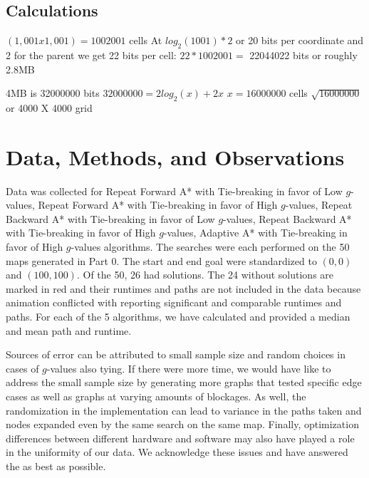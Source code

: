 \documentclass[a4paper,12pt]{article}
\begin{document}
\subsection{Calculations}
$(1,001 x 1,001) = 1002001$ cells \newline
At $log_{2}(1001) * 2$ or 20 bits per coordinate and 2 for the parent we get 22 bits per cell: \newline
$22 * 1002001  = $ 22044022 bits or roughly 2.8MB \newline \newline

4MB  is 32000000 bits \newline
$32000000 = 2log_{2}(x)  + 2x$ \newline
$x = 16000000$ cells \newline
$\sqrt{16000000}$ or 4000 X 4000 grid


\section{Data, Methods, and Observations}

Data was collected for Repeat Forward A* with Tie-breaking in favor of Low $g$-values, Repeat Forward A* with Tie-breaking in favor of High $g$-values,  Repeat Backward A* with Tie-breaking in favor of Low $g$-values, Repeat Backward A* with Tie-breaking in favor of High $g$-values, Adaptive A* with Tie-breaking in favor of High $g$-values algorithms. The searches were each performed on the 50 maps generated in Part 0. The start and end goal were standardized to $(0,0)$ and $(100,100)$. Of the 50, 26 had solutions. The 24 without solutions are marked in red and their runtimes and paths are not included in the data because animation conflicted with reporting significant and comparable runtimes and paths. For each of the 5 algorithms, we have calculated and provided a median and mean path and runtime. 

Sources of error can be attributed to small sample size and random choices in cases of $g$-values also tying. If there were more time, we would have like to address the small sample size by generating more graphs that tested specific edge cases as well as graphs at varying amounts of blockages. As well, the randomization in the implementation can lead to variance in the paths taken and nodes expanded even by the same search on the same map. Finally, optimization differences between different hardware and software may also have played a role in the uniformity of our data. We acknowledge these issues and have answered the as best as possible. 
\end{document}
